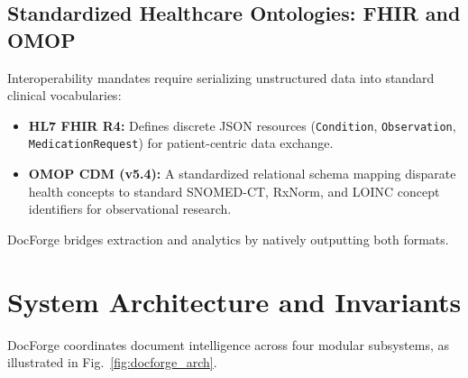 \documentclass[10pt,journal,compsoc]{IEEEtran}
\begin{document}
\subsection{Standardized Healthcare Ontologies: FHIR and OMOP}
Interoperability mandates require serializing unstructured data into standard clinical vocabularies:
\begin{itemize}
    \item \textbf{HL7 FHIR R4:} Defines discrete JSON resources (\texttt{Condition}, \texttt{Observation}, \texttt{MedicationRequest}) for patient-centric data exchange.
    \item \textbf{OMOP CDM (v5.4):} A standardized relational schema mapping disparate health concepts to standard SNOMED-CT, RxNorm, and LOINC concept identifiers for observational research.
\end{itemize}
DocForge bridges extraction and analytics by natively outputting both formats.

\section{System Architecture and Invariants}
DocForge coordinates document intelligence across four modular subsystems, as illustrated in Fig.~\ref{fig:docforge_arch}.
\end{document}
